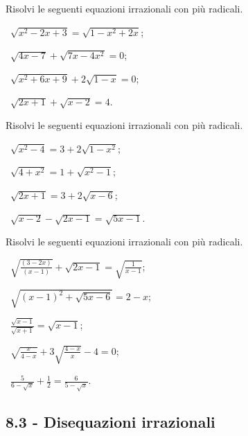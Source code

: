 \begin{esercizio}[\Ast]
 \label{ese:8.15}
Risolvi le seguenti equazioni irrazionali con più radicali.
\begin{multicols}{2}
 \begin{enumeratea}
 \item~$\sqrt{x^2-2x+3}=\sqrt{1-x^2+2x}$;
 \item~$\sqrt{4x-7}+\sqrt{7x-4x^2}=0$;
 \item~$\sqrt{x^2+6x+9}+2\sqrt{1-x}=0$;
 \item~$\sqrt{2x+1}+\sqrt{x-2}=4$.
 \end{enumeratea}
 \end{multicols}
\end{esercizio}

\begin{esercizio}[\Ast]
 \label{ese:8.16}
Risolvi le seguenti equazioni irrazionali con più radicali.
\begin{multicols}{2}
 \begin{enumeratea}
 \item~$\sqrt{x^2-4}=3+2\sqrt{1-x^2}$;
 \item~$\sqrt{4+x^2}=1+\sqrt{x^2-1}$;
 \item~$\sqrt{2x+1}=3+2\sqrt{x-6}$;
 \item~$\sqrt{x-2}-\sqrt{2x-1}=\sqrt{5x-1}$.
 \end{enumeratea}
 \end{multicols}
\end{esercizio}
\pagebreak
\begin{esercizio}[\Ast]
 \label{ese:8.17}
Risolvi le seguenti equazioni irrazionali con più radicali.
\begin{multicols}{2}
 \begin{enumeratea}
 \item~$\sqrt{\frac{(3-2x)}{(x-1)}}+\sqrt{2x-1}=\sqrt{\frac 1{x-1}}$;
 \item~$\sqrt{(x-1)^2+\sqrt{5x-6}}=2-x$;
 \item~$\frac{\sqrt{x-1}}{\sqrt{x+1}}=\sqrt{x-1}$;
 \item~$\sqrt{\frac x{4-x}}+3\sqrt{\frac{4-x} x}-4=0$;
 \item~$\frac 5{6-\sqrt x}+\frac 1 2=\frac 6{5-\sqrt x}$.
 \end{enumeratea}
 \end{multicols}
\end{esercizio}

\subsection*{8.3 - Disequazioni irrazionali}

